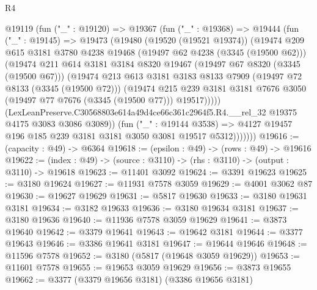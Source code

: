 \begin{lexlean}{R4}
\begin{coremodule}
          @19119
            (fun ("_" : @19120) =>
            @19367
              (fun ("_" : @19368) =>
              @19444
                (fun ("_" : @19145) =>
                @19473
                  (@19480
                    (@19520 (@19521 @19374))
                    (@19474
                      @209
                      @615
                      @3181
                      @3780
                      @4238
                      @19468
                      (@19497 @62 @4238 (@3345 (@19500 @62)))
                      (@19474
                        @211
                        @614
                        @3181
                        @3184
                        @8320
                        @19467
                        (@19497 @67 @8320 (@3345 (@19500 @67)))
                        (@19474
                          @213
                          @613
                          @3181
                          @3183
                          @8133
                          @7909
                          (@19497 @72 @8133 (@3345 (@19500 @72)))
                          (@19474
                            @215
                            @239
                            @3181
                            @3181
                            @7676
                            @3050
                            (@19497 @77 @7676 (@3345 (@19500 @77)))
                            @19517)))))
                  (LexLeanPreserve.C30568803e614a49d4ce66c361c2964f5.R4.__rel_32
                    @19375
                    @4175
                    @3083
                    @3086
                    @3089))
                (fun ("_" : @19144 @3538) =>
                @4127 @19457 @196 @185 @239 @3181 @3181 @3050 @3081 @19517 @5312)))))))
@19616 := (capacity : @49) -> @6364
@19618 := (epsilon : @49) -> (rows : @49) -> @19616
@19622 := (index : @49) -> (source : @3110) -> (rhs : @3110) -> (output : @3110) -> @19618
@19623 := @11401 @3092
@19624 := @3391 @19623
@19625 := @3180 @19624
@19627 := @11931 @7578 @3059
@19629 := @4001 @3062 @87
@19630 := @19627 @19629
@19631 := @5817 @19630
@19633 := @3180 @19631 @3181
@19634 := @3182 @19633
@19636 := @3180 @19634 @3181
@19637 := @3180 @19636
@19640 := @11936 @7578 @3059 @19629
@19641 := @3873 @19640
@19642 := @3379 @19641
@19643 := @19642 @3181
@19644 := @3377 @19643
@19646 := @3386 @19641 @3181
@19647 := @19644 @19646
@19648 := @11596 @7578
@19652 := @3180 (@5817 (@19648 @3059 @19629))
@19653 := @11601 @7578
@19655 := @19653 @3059 @19629
@19656 := @3873 @19655
@19662 := @3377 (@3379 @19656 @3181) (@3386 @19656 @3181)

\end{coremodule}
\end{lexlean}
